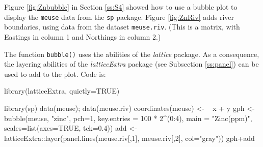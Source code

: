 \documentclass{tufte-book}\usepackage[]{graphicx}\usepackage[]{color}
\newcommand{\txtt}[1]{\texttt{#1}}
\begin{document}
Figure \ref{fig:Znbubble} in Section \ref{ss:S4} showed how to use a
bubble plot to display the \txtt{meuse} data from the \txtt{sp}
package.  Figure \ref{fig:ZnRiv} adds river boundaries, using data from the
dataset \txtt{meuse.riv}.  (This is a matrix, with Eastings in column
1 and Northings in column 2.)

The function \txtt{bubble()} uses the abilities of the {\em lattice}
package. As a consequence, the layering abilities of the {\em
  latticeExtra} package (see Subsection \ref{ss:panel}) can be used to
add to the plot. Code is:
\begin{Schunk}
\begin{Sinput}
library(latticeExtra, quietly=TRUE)
\end{Sinput}
\end{Schunk}

\begin{Schunk}
\begin{Sinput}
library(sp)
data(meuse); data(meuse.riv)
coordinates(meuse) <- ~ x + y
gph <- bubble(meuse, "zinc", pch=1, key.entries =  100 * 2^(0:4),
              main = "Zinc(ppm)", scales=list(axes=TRUE, tck=0.4))
add <- latticeExtra::layer(panel.lines(meuse.riv[,1], meuse.riv[,2],
                      col="gray"))
gph+add
\end{Sinput}
\end{Schunk}
\end{document}
